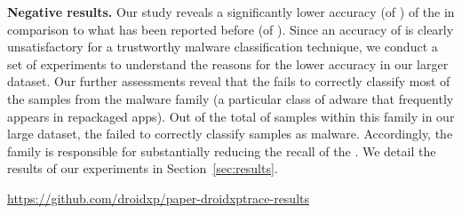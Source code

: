 {\bf Negative results.} Our study reveals a significantly lower
accuracy (\fone of \fscore) of the \mas in comparison to what has been reported before (\fone of \fscoreSmall). 
Since an accuracy of \fscore is clearly unsatisfactory for a trustworthy malware classification technique, we conduct a set of experiments 
to understand the reasons for the lower accuracy in our larger dataset.
Our further assessments reveal that the \mas fails to correctly classify most of the samples from
the \gps malware family (a particular class of adware that frequently appears in repackaged apps). 
Out of the total of \appsGps samples within this family in our large dataset, the \mas failed to correctly classify \appsGpsFN samples as malware.
Accordingly, the \gps family is responsible for substantially reducing the recall of the \mas. We detail the results of our experiments in Section~\ref{sec:results}. %


\begin{small}
  \begin{center}
    \url{https://github.com/droidxp/paper-droidxptrace-results}
  \end{center}
\end{small}

